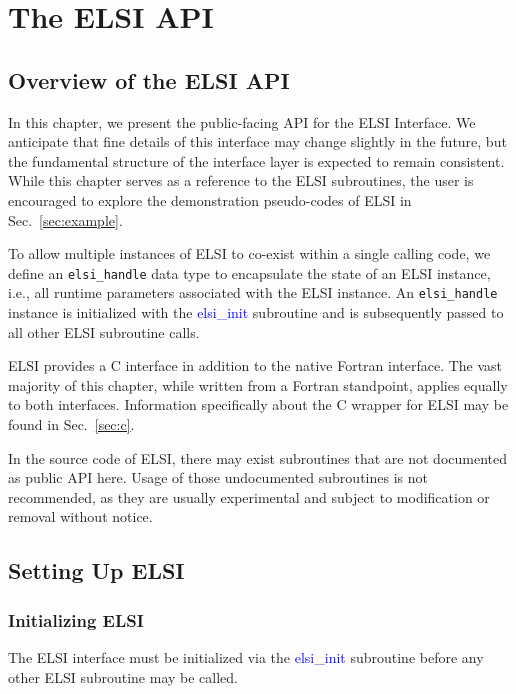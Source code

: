 \documentclass{report}
\newcommand{\tcb}[1]{\textcolor{blue}{#1}}
\begin{document}
\chapter{The ELSI API}
\section{Overview of the ELSI API}
\label{sec:api}
In this chapter, we present the public-facing API for the ELSI Interface. We anticipate that fine details of this interface may change slightly in the future, but the fundamental structure of the interface layer is expected to remain consistent. While this chapter serves as a reference to the ELSI subroutines, the user is encouraged to explore the demonstration pseudo-codes of ELSI in Sec.~\ref{sec:example}.

To allow multiple instances of ELSI to co-exist within a single calling code, we define an \texttt{elsi\_handle} data type to encapsulate the state of an ELSI instance, i.e., all runtime parameters associated with the ELSI instance. An \texttt{elsi\_handle} instance is initialized with the \tcb{elsi\_init} subroutine and is subsequently passed to all other ELSI subroutine calls.

ELSI provides a C interface in addition to the native Fortran interface. The vast majority of this chapter, while written from a Fortran standpoint, applies equally to both interfaces. Information specifically about the C wrapper for ELSI may be found in Sec.~\ref{sec:c}.

In the source code of ELSI, there may exist subroutines that are not documented as public API here. Usage of those undocumented subroutines is not recommended, as they are usually experimental and subject to modification or removal without notice.

\section{Setting Up ELSI}
\label{sec:setup}
\subsection{Initializing ELSI}
\label{subsec:setup_init}
The ELSI interface must be initialized via the \tcb{elsi\_init} subroutine before any other ELSI subroutine may be called.
\end{document}
